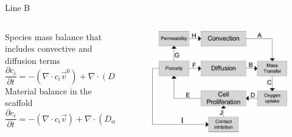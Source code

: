 \documentclass[11pt,t]{beamer}
\begin{document}
\begin{frame}[fragile]{Line B}  

	\begin{columns}[t]
		\begin{column}{.75\textwidth}
Species mass balance that includes convective and diffusion terms
\[
\frac { \partial c _ { i } } { \partial t } = - \left( \nabla \cdot c _ { i } \vec { v } ^ { 0 } \right) + \nabla \cdot \left( D _ { i } \nabla c _ { i } \right)
\]
Material balance in the scaffold
\[
\frac { \partial c _ { i } } { \partial t } = - \left( \nabla \cdot c _ { i } \vec { v } \right) + \nabla \cdot \left( D _ { \mathrm { eff } _ { i } } \nabla c _ { i } \right) + R _ { i }
\]

		\end{column}
		\begin{column}{.25\textwidth}
			
			\begin{figure}
			\centering
			\includegraphics[width=\textwidth]{math_scheme}
			
			\end{figure}
		\end{column}
	\end{columns}	
		
\end{frame}
\end{document}
